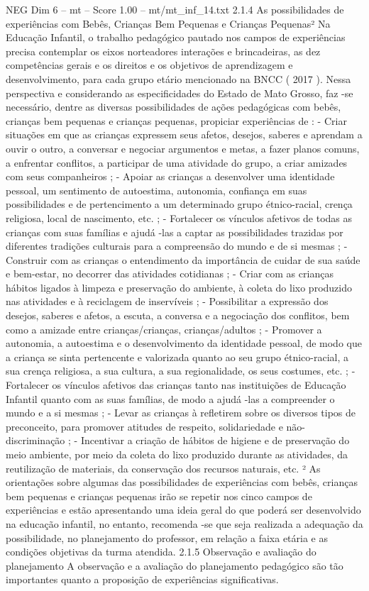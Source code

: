 \begin{textsample}{NEG Dim 6 – mt – Score 1.00 – mt/mt\_inf\_14.txt}  \label{ex:f6_neg_123}
2.1.4 As possibilidades de experiências com Bebês, Crianças Bem Pequenas e Crianças Pequenas² Na Educação Infantil, o trabalho pedagógico pautado nos campos de experiências precisa contemplar os eixos norteadores interações e brincadeiras, as dez competências gerais e os direitos e os objetivos de aprendizagem e desenvolvimento, para cada grupo etário mencionado na BNCC ( 2017 ).
Nessa perspectiva e considerando as especificidades do Estado de Mato Grosso, faz -se necessário, dentre as diversas possibilidades de ações pedagógicas com bebês, crianças bem pequenas e crianças pequenas, propiciar experiências de : - Criar situações em que as crianças expressem seus afetos, desejos, saberes e aprendam a ouvir o outro, a conversar e negociar argumentos e metas, a fazer planos comuns, a enfrentar conflitos, a participar de uma atividade do grupo, a criar amizades com seus companheiros ; - Apoiar as crianças a desenvolver uma identidade pessoal, um sentimento de autoestima, autonomia, confiança em suas possibilidades e de pertencimento a um determinado grupo étnico-racial, crença religiosa, local de nascimento, etc. ; - Fortalecer os vínculos afetivos de todas as crianças com suas famílias e ajudá -las a captar as possibilidades trazidas por diferentes tradições culturais para a compreensão do mundo e de si mesmas ; - Construir com as crianças o entendimento da importância de cuidar de sua saúde e bem-estar, no decorrer das atividades cotidianas ; - Criar com as crianças hábitos ligados à limpeza e preservação do ambiente, à coleta do lixo produzido nas atividades e à reciclagem de inservíveis ; - Possibilitar a expressão dos desejos, saberes e afetos, a escuta, a conversa e a negociação dos conflitos, bem como a amizade entre crianças/crianças, crianças/adultos ; - Promover a autonomia, a autoestima e o desenvolvimento da identidade pessoal, de modo que a criança se sinta pertencente e valorizada quanto ao seu grupo étnico-racial, a sua crença religiosa, a sua cultura, a sua regionalidade, os seus costumes, etc. ; - Fortalecer os vínculos afetivos das crianças tanto nas instituições de Educação Infantil quanto com as suas famílias, de modo a ajudá -las a compreender o mundo e a si mesmas ; - Levar as crianças à refletirem sobre os diversos tipos de preconceito, para promover atitudes de respeito, solidariedade e não-discriminação ; - Incentivar a criação de hábitos de higiene e de preservação do meio ambiente, por meio da coleta do lixo produzido durante as atividades, da reutilização de materiais, da conservação dos recursos naturais, etc. ² As orientações sobre algumas das possibilidades de experiências com bebês, crianças bem pequenas e crianças pequenas irão se repetir nos cinco campos de experiências e estão apresentando uma ideia geral do que poderá ser desenvolvido na educação infantil, no entanto, recomenda -se que seja realizada a adequação da possibilidade, no planejamento do professor, em relação a faixa etária e as condições objetivas da turma atendida. 2.1.5 Observação e avaliação do planejamento A observação e a avaliação do planejamento pedagógico são tão importantes quanto a proposição de experiências significativas.

\end{textsample}

